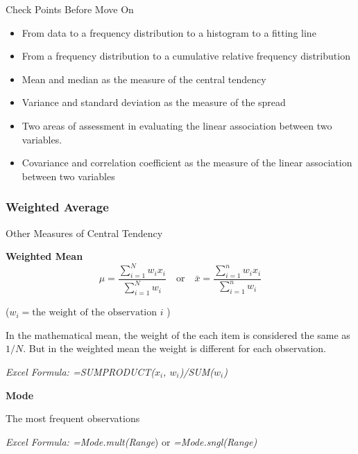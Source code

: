 \documentclass{beamer}
\begin{document}
\begin{frame}{Check Points Before Move On}

\begin{itemize}
\item From data to a frequency distribution to a histogram to a fitting line
\item From a frequency distribution to a cumulative relative frequency distribution
\item Mean and median as the measure of the central tendency
\item Variance and standard deviation as the measure of the spread
\item Two areas of assessment in evaluating the linear association between two variables. 
\item Covariance and correlation coefficient as the measure of the linear association between two variables


\end{itemize}


\end{frame}


\subsubsection{Weighted Average}
\begin{frame}{Other Measures of Central Tendency}



\textbf{Weighted Mean}
$$\mu = \frac{\sum_{i=1}^{N}w_ix_i}{\sum_{i=1}^{N}w_i} \quad\text{or}\quad \bar{x} = \frac{\sum_{i=1}^{n}w_ix_i}{\sum_{i=1}^{n}w_i}   $$
\begin{center}
($w_i = \text{the weight of the observation}$ $i$ )\end{center}
In the mathematical mean, the weight of the each item is considered the same as $1/N$. But in the weighted mean the weight is different for each observation. 

\begin{flushright}
\textit{Excel Formula: =SUMPRODUCT($x_i$, $w_i$)/SUM($w_i$)}
\end{flushright}



\textbf{Mode} 
\begin{center}
The most frequent observations
\begin{flushright}
\textit{Excel Formula: =Mode.mult(Range}) or \textit{=Mode.sngl(Range)}

\end{flushright}
\end{center}
\end{frame}
\end{document}
